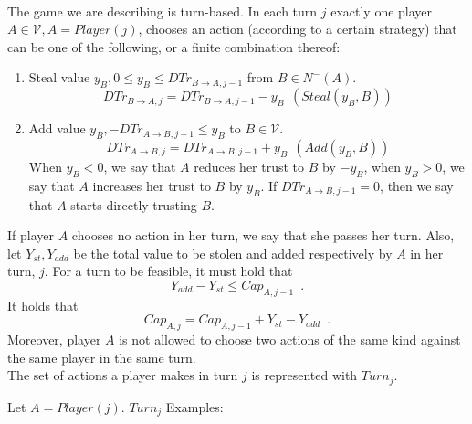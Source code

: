 \documentclass[11pt]{llncs}
\begin{document}
     \begin{definition}[Turns] \ \\
        The game we are describing is turn-based. In each turn $j$ exactly one player $A \in \mathcal{V}, A =
        Player\left(j\right)$, chooses an action (according to a certain strategy) that can be one of the following, or a
        finite combination thereof:
        \begin{enumerate}
           \item Steal value $y_B, 0 \leq y_B \leq DTr_{B \rightarrow A, j-1}$ from $B \in N^{-}\left(A\right)$.
           \begin{equation}
              DTr_{B \rightarrow A, j} = DTr_{B \rightarrow A, j-1} - y_B \:\: \left(Steal\left(y_B, B\right)\right)
           \end{equation}
           \item Add value $y_B, -DTr_{A \rightarrow B, j-1} \leq y_B$ to $B \in \mathcal{V}$.
           \begin{equation}
              DTr_{A \rightarrow B, j} = DTr_{A \rightarrow B, j-1} + y_B \:\: \left(Add\left(y_B, B\right)\right)
           \end{equation}
           When $y_B < 0$, we say that $A$ reduces her trust to $B$ by $-y_B$, when $y_B > 0$, we say that $A$ increases her
           trust to $B$ by $y_B$. If $DTr_{A \rightarrow B, j-1} = 0$, then we say that $A$ starts directly trusting $B$.
        \end{enumerate}
        If player $A$ chooses no action in her turn, we say that she passes her turn. Also, let $Y_{st}, Y_{add}$ be the
        total value to be stolen and added respectively by $A$ in her turn, $j$. For a turn to be feasible, it must hold
        that
        \begin{equation}
           Y_{add} - Y_{st} \leq Cap_{A, j-1} \enspace.
        \end{equation}
        It holds that
        \begin{equation}
           Cap_{A, j} = Cap_{A, j-1} + Y_{st} - Y_{add} \enspace.
        \end{equation}
        Moreover, player $A$ is not allowed to choose two actions of the same kind against the same player in the same turn.
        \\ The set of actions a player makes in turn $j$ is represented with $Turn_j$.
     \end{definition}
     Let $A = Player(j)$. $Turn_j$ Examples:
\end{document}
